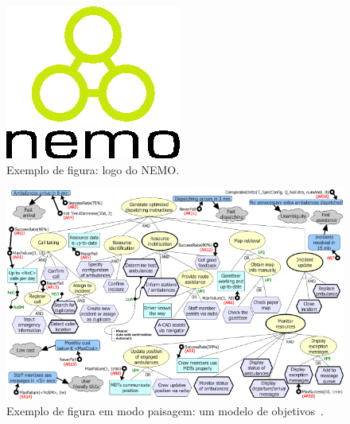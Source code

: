 \begin{figure}[h!]
\centering
\includegraphics[width=.25\textwidth]{figuras/fig-dicaslatex-nemologo} 
\caption{Exemplo de figura: logo do NEMO.}
\label{fig-dicaslatex-nemologo}
\end{figure}

\begin{figure}
\centering
\includegraphics[width=\textwidth]{figuras/fig-dicaslatex-exemplosideways} 
\caption{Exemplo de figura em modo paisagem: um modelo de objetivos~\cite{souza-mylopoulos:spe13}.}
\label{fig-dicaslatex-exemplosideways}
\end{figure}